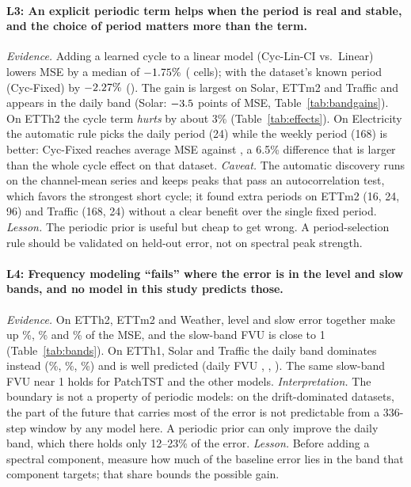 \documentclass[11pt,a4paper]{article}
\newcommand{\lrn}[1]{\textbf{L#1}}
\begin{document}
\paragraph{\lrn{3}: An explicit periodic term helps when the period is real and stable, and the choice of period matters more than the term.}
\emph{Evidence.} Adding a learned cycle to a linear model (Cyc-Lin-CI vs.\ Linear) lowers MSE by a median of $-1.75\%$ (\cmpCycLinCIvsLinearwins{} cells); with the dataset's known period (Cyc-Fixed) by $-2.27\%$ (\cmpCycFixedvsLinearwins). The gain is largest on Solar, ETTm2 and Traffic and appears in the daily band (Solar: $-3.5$ points of MSE, Table~\ref{tab:bandgains}). On ETTh2 the cycle term \emph{hurts} by about 3\% (Table~\ref{tab:effects}). On Electricity the automatic rule picks the daily period (24) while the weekly period (168) is better: Cyc-Fixed reaches \elecCycFixed{} average MSE against \elecCycLinCI{}, a 6.5\% difference that is larger than the whole cycle effect on that dataset.
\emph{Caveat.} The automatic discovery runs on the channel-mean series and keeps peaks that pass an autocorrelation test, which favors the strongest short cycle; it found extra periods on ETTm2 (16, 24, 96) and Traffic (168, 24) without a clear benefit over the single fixed period.
\emph{Lesson.} The periodic prior is useful but cheap to get wrong. A period-selection rule should be validated on held-out error, not on spectral peak strength.

\begin{table}[t]
\centering
\caption{Where the error lives (Cyc-Lin-CI, averaged over horizons). Share of MSE per band, band FVU, and skill against seasonal naive. Missing bands at $H{=}96$ are skipped in the average.}
\label{tab:bands}
\resizebox{\columnwidth}{!}{}
\end{table}

\paragraph{\lrn{4}: Frequency modeling ``fails'' where the error is in the level and slow bands, and no model in this study predicts those.}
\emph{Evidence.} On ETTh2, ETTm2 and Weather, level and slow error together make up \levslowShareEhTwo\%, \levslowShareEmTwo\% and \levslowShareWeather\% of the MSE, and the slow-band FVU is close to 1 (Table~\ref{tab:bands}). On ETTh1, Solar and Traffic the daily band dominates instead (\dailyShareEhOne\%, \dailyShareSolar\%, \dailyShareTraffic\%) and is well predicted (daily FVU \dailyFVUEhOne, \dailyFVUSolar, \dailyFVUTraffic). The same slow-band FVU near 1 holds for PatchTST and the other models.
\emph{Interpretation.} The boundary is not a property of periodic models: on the drift-dominated datasets, the part of the future that carries most of the error is not predictable from a 336-step window by any model here. A periodic prior can only improve the daily band, which there holds only 12--23\% of the error.
\emph{Lesson.} Before adding a spectral component, measure how much of the baseline error lies in the band that component targets; that share bounds the possible gain.
\end{document}
